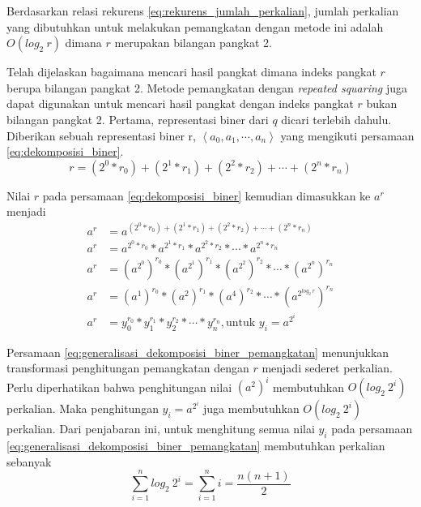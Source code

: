 Berdasarkan relasi rekurens \eqref{eq:rekurens_jumlah_perkalian}, jumlah perkalian yang dibutuhkan untuk melakukan pemangkatan dengan metode ini adalah $O(log_2\ r)$ dimana $r$ merupakan bilangan pangkat 2.

Telah dijelaskan bagaimana mencari hasil pangkat dimana indeks pangkat $r$ berupa bilangan pangkat 2. Metode pemangkatan dengan \textit{repeated squaring} juga dapat digunakan untuk mencari hasil pangkat dengan indeks pangkat $ r $ bukan bilangan pangkat 2. Pertama, representasi biner dari $ q $ dicari terlebih dahulu. Diberikan sebuah representasi biner r, $ \left\langle a_0,a_1,\cdots,a_n\right\rangle $ yang mengikuti persamaan \eqref{eq:dekomposisi_biner}.
\begin{equation}
r = (2^0 * r_0) + (2^1* r_1) + (2^2 * r_2) + \cdots + (2^n* r_n)
\label{eq:dekomposisi_biner}
\end{equation}

Nilai $ r $ pada persamaan \eqref{eq:dekomposisi_biner} kemudian dimasukkan ke $ a^r $ menjadi
\begin{align}
a^r &= a^{(2^0 * r_0) + (2^1 * r_1) + (2^2 * r_2) + \cdots + (2^n * r_n)} \\
a^r &= a^{2^0 * r_0} * a^{2^1 * r_1} * a^{2^2 * r_2} * \cdots * a^{2^n * r_n} \\ 
a^r &= (a^{2^0})^{r_0} * (a^{2^1})^{r_1} * (a^{2^2})^{r_2} * \cdots * (a^{2^n})^{r_n} \\
a^r &= (a^1)^{r_0} * (a^2)^{r_1} * (a^4)^{r_2} * \cdots * (a^{2^{log_2\ r}})^{r_n} \\
a^r &= y_0^{r_0} * y_1^{r_1} * y_2^{r_2} * \cdots * y_n^{r_n},\text{untuk } y_i=a^{2^i}
\label{eq:generalisasi_dekomposisi_biner_pemangkatan}
\end{align}

Persamaan \eqref{eq:generalisasi_dekomposisi_biner_pemangkatan} menunjukkan transformasi penghitungan pemangkatan dengan $ r $ menjadi sederet perkalian. Perlu diperhatikan bahwa penghitungan nilai $ (a^2)^i $ membutuhkan $ O(log_2\ 2^i) $ perkalian. Maka penghitungan $ y_i=a^{2^i} $ juga membutuhkan $ O(log_2\ 2^i) $ perkalian. Dari penjabaran ini, untuk menghitung semua nilai $ y_i $ pada persamaan \eqref{eq:generalisasi_dekomposisi_biner_pemangkatan} membutuhkan perkalian sebanyak
\begin{equation}
\sum_{i=1}^{n} log_2\ {2^i}=\sum_{i=1}^{n} i=\frac{n(n+1)}{2}
\label{eq:jumlah_perkalian_generalisasi_dekomposisi_biner}
\end{equation}

